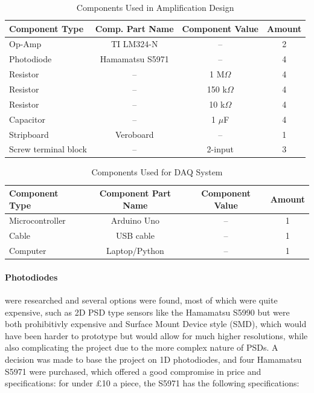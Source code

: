 \begin{table}[htbp]
  \centering
  \begin{threeparttable}
    \caption{Components Used in Amplification Design}
    \label{tab:components_list_stripboard}
    
    \begin{tabular}{lccc}  
      \toprule
      \textbf{Component Type} & \textbf{Comp. Part Name} & \textbf{Component Value} & \textbf{Amount} \\
      \midrule
      Op-Amp & TI LM324-N & -- & 2 \\
      Photodiode & Hamamatsu S5971 & -- & 4 \\
      Resistor & -- & 1 M$\Omega$ & 4 \\
      Resistor & -- & 150 k$\Omega$ & 4 \\
      Resistor & -- & 10 k$\Omega$ & 4 \\
      Capacitor & -- & 1 $\mu$F & 4 \\
      Stripboard & Veroboard & -- & 1 \\
      Screw terminal block & -- & 2-input & 3 \\
      \bottomrule
    \end{tabular}
    
  \end{threeparttable}
\end{table}

\begin{table}[htbp]
  \centering
  \begin{threeparttable}
    \caption{Components Used for DAQ System}
    \label{tab:daq_components}
    
    \begin{tabular}{lccc}  
      \toprule
      \textbf{Component Type} & \textbf{Component Part Name} & \textbf{Component Value} & \textbf{Amount} \\
      \midrule
      Microcontroller & Arduino Uno & -- & 1 \\
      Cable & USB cable & -- & 1 \\
      Computer & Laptop/Python & -- & 1 \\
      \bottomrule
    \end{tabular}
    
  \end{threeparttable}
\end{table}

\paragraph{Photodiodes} were researched and several options were found, most of which were quite expensive, such as 2D PSD type sensors like the Hamamatsu S5990 but were both prohibitivly expensive and Surface Mount Device style (SMD), which would have been harder to prototype but would allow for much higher resolutions, while also complicating the project due to the more complex nature of PSDs. A decision was made to base the project on 1D photodiodes, and four Hamamatsu S5971 were purchased, which offered a good compromise in price and specifications: for under £10 a piece, the S5971 has the following specifications:

